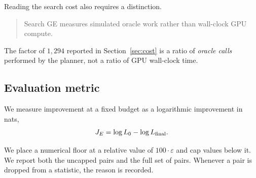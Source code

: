 Reading the search cost also requires a distinction.

\begin{quote}
Search GE measures simulated oracle work rather than wall-clock GPU compute.
\end{quote}

The factor of $1{,}294$ reported in Section~\ref{sec:cost} is a ratio of
\emph{oracle calls} performed by the planner, not a ratio of GPU wall-clock time.

\subsection{Evaluation metric}

We measure improvement at a fixed budget as a logarithmic improvement in nats,
\begin{equation}
  J_E = \log L_0 - \log L_{\text{final}} .
\end{equation}

We place a numerical floor at a relative value of $100 \cdot \varepsilon$ and cap
values below it. We report both the uncapped pairs and the full set of pairs.
Whenever a pair is dropped from a statistic, the reason is recorded.

